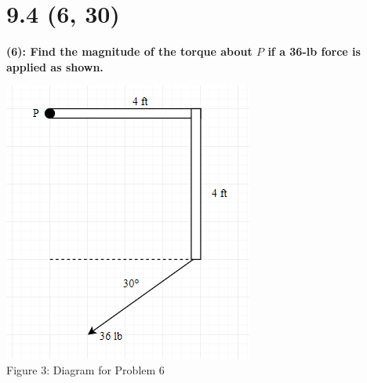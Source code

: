 \documentclass[12]{article}
\begin{document}
\section{9.4 (6, 30)}
\textbf{(6): Find the magnitude of the torque about $P$ if a 36-lb force is applied as shown.}\\
\begin{center}
\includegraphics[scale=.75]{6_FBD.png}\\
Figure 3: Diagram for Problem 6
\end{center}
\end{document}

